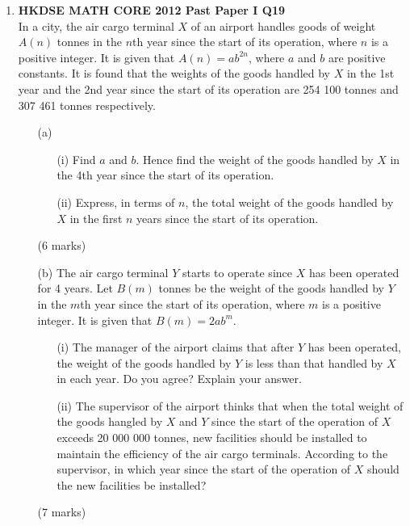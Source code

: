 \documentclass[12pt]{article}
\begin{document}
\begin{enumerate}
	\item \textbf{HKDSE MATH CORE 2012 Past Paper I Q19}\\
	In a city, the air cargo terminal $X$ of an airport handles goods of weight $A(n)$ tonnes in the $n$th year since the start of its operation, where $n$ is a positive integer. It is given that $A(n) = ab^{2n}$, where $a$ and $b$ are positive constants. It is found that the weights of the goods handled by $X$ in the 1st year and the 2nd year since the start of its operation are 254 100 tonnes and 307 461 tonnes respectively.
	\begin{enumerate}
		\item[(a)]
		\begin{enumerate}
			\item[(i)] Find $a$ and $b$. Hence find the weight of the goods handled by $X$ in the 4th year since the start of its operation.
			\item[(ii)] Express, in terms of $n$, the total weight of the goods handled by $X$ in the first $n$ years since the start of its operation.
		\end{enumerate}
		(6 marks)
		\item[(b)] The air cargo terminal $Y$ starts to operate since $X$ has been operated for 4 years. Let $B(m)$ tonnes be the weight of the goods handled by $Y$ in the $m$th year since the start of its operation, where $m$ is a positive integer. It is given that $B(m) = 2ab^m$.
		\begin{enumerate}
			\item[(i)] The manager of the airport claims that after $Y$ has been operated, the weight of the goods handled by $Y$ is less than that handled by $X$ in each year. Do you agree? Explain your answer.
			\item[(ii)] The supervisor of the airport thinks that when the total weight of the goods hangled by $X$ and $Y$ since the start of the operation of $X$ exceeds 20 000 000 tonnes, new facilities should be installed to maintain the efficiency of the air cargo terminals. According to the supervisor, in which year since the start of the operation of $X$ should the new facilities be installed?
		\end{enumerate}
		(7 marks)
	\end{enumerate}
\end{enumerate}
\end{document}
